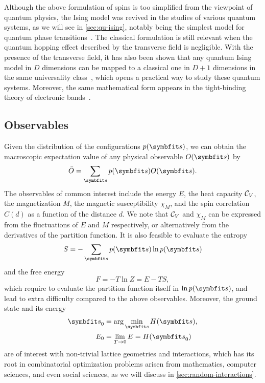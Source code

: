 Although the above formulation of spins is too simplified from the viewpoint of quantum physics, the Ising model was revived in the studies of various quantum systems, as we will see in \cref{sec:qu-ising}, notably being the simplest model for quantum phase transitions~\cite{sachdev2001quantum}. The classical formulation is still relevant when the quantum hopping effect described by the transverse field is negligible. With the presence of the transverse field, it has also been shown that any quantum Ising model in $D$ dimensions can be mapped to a classical one in $D + 1$ dimensions in the same universality class~\cite{hertz1976quantum}, which opens a practical way to study these quantum systems. Moreover, the same mathematical form appears in the tight-binding theory of electronic bands~\cite{treglia1988segregation}.

\subsection{Observables}

Given the distribution of the configurations $p(\vs)$, we can obtain the macroscopic expectation value of any physical observable $O(\vs)$ by
\begin{equation}
\bar{O} = \sum_\vs p(\vs) O(\vs).
\label{eq:cl-obs}
\end{equation}
The observables of common interest include the energy $E$, the heat capacity $\mathcal{C}_V$, the magnetization $M$, the magnetic susceptibility $\chi_M$, and the spin correlation $C(d)$ as a function of the distance $d$. We note that $\mathcal{C}_V$ and $\chi_M$ can be expressed from the fluctuations of $E$ and $M$ respectively, or alternatively from the derivatives of the partition function. It is also feasible to evaluate the entropy
\begin{equation}
S = -\sum_\vs p(\vs) \ln p(\vs)
\end{equation}
and the free energy
\begin{equation}
F = -T \ln Z = E - T S,
\end{equation}
which require to evaluate the partition function itself in $\ln p(\vs)$, and lead to extra difficulty compared to the above observables. Moreover, the ground state and its energy
\begin{align}
\vs_0 &= \arg\min_\vs H(\vs), \\
E_0 &= \lim_{T \to 0} E = H(\vs_0)
\end{align}
are of interest with non-trivial lattice geometries and interactions, which has its root in combinatorial optimization problems arisen from mathematics, computer sciences, and even social sciences, as we will discuss in \cref{sec:random-interactions}.

